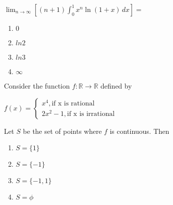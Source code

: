                 \item $\lim_{n \to \infty} \left[ (n+1) \int_{0}^{1} x^n \ln(1+x) \, dx \right] =$
                \begin{multicols}{4}
                \begin{enumerate}
                    \item $0$
                    \item $ln 2$
                    \item $ln 3$
                    \item $\infty$
                \end{enumerate}
                    
                \end{multicols}

                \item Consider the function $f: \mathbb{R} \to \mathbb{R}$ defined by
                \begin{center}
			$  f(x)=\begin{cases}
                   x^4,  \text{if  x  is rational} \\
                   2x^2-1,  \text{if x is irrational}
                    \end{cases}$ 
                \end{center}
                Let $S$ be the set of points where $f$ is continuous. Then 
                \begin{multicols}{4}
                \begin{enumerate}
                \item $S=\{1\}$
                    \item $S=\{-1\}$
                    \item $S=\{-1,1\}$
                    \item $S=\phi$
                \end{enumerate}
                    
                \end{multicols}

